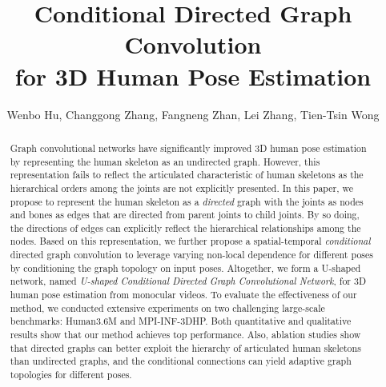 \documentclass[sigconf]{acmart}
\begin{document}
\fancyhead{}
	
\title{Conditional Directed Graph Convolution \\ for 3D Human Pose Estimation}

\renewcommand\footnoterule{\kern-3pt \hrule width 2in \kern 2.6pt}

\renewcommand{\thefootnote}{\fnsymbol{footnote}}
\author{Wenbo Hu, Changgong Zhang, Fangneng Zhan, Lei Zhang, Tien-Tsin Wong}
\def\authors{Wenbo Hu, Changgong Zhang, Fangneng Zhan, Lei Zhang, Tien-Tsin Wong}
\renewcommand{\shortauthors}{Hu et al.}




	\begin{abstract}
		Graph convolutional networks have significantly improved 3D human pose estimation by representing the human skeleton as an undirected graph.
		However, this representation fails to reflect the articulated characteristic of human skeletons as the hierarchical orders among the joints are not explicitly presented.
		In this paper, we propose to represent the human skeleton as a \emph{directed} graph with the joints as nodes and bones as edges that are directed from parent joints to child joints.
		By so doing, the directions of edges can explicitly reflect the hierarchical relationships among the nodes.
		Based on this representation,		
		we further propose a spatial-temporal \emph{conditional} directed graph convolution to leverage varying non-local dependence for different poses by conditioning the graph topology on input poses. 
		Altogether, we form a U-shaped network,
		named \emph{U-shaped Conditional Directed Graph Convolutional Network}, for 3D human pose estimation from monocular videos.
		To evaluate the effectiveness of our method, we conducted extensive experiments on two challenging large-scale benchmarks: Human3.6M and MPI-INF-3DHP.
		Both quantitative and qualitative results show that our method achieves top performance.	
		Also, ablation studies show that directed graphs can better exploit the hierarchy of articulated human skeletons than undirected graphs, and the conditional connections can yield adaptive graph topologies for different poses.

	\end{abstract}
	
\end{document}
